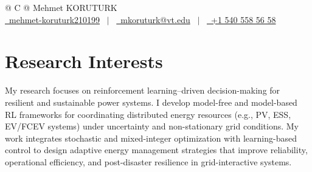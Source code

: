 \documentclass[a4paper,12pt]{article}
\begin{document}
\pagestyle{empty} 



\begin{tabularx}{\linewidth}{@{} C @{}}
\Huge{Mehmet KORUTURK} \\[7.5pt]
\href{https://www.linkedin.com/in/mehmet-koruturk210199/}{\ mehmet-koruturk210199} \ $|$ \ 
\href{mailto:mkoruturk@vt.edu}{\ mkoruturk@vt.edu} \ $|$ \ 
\href{tel:+15405585658}{\ +1 540 558 56 58} \\
\end{tabularx}


\section{Research Interests}

My research focuses on reinforcement learning–driven decision-making 
for resilient and sustainable power systems. I develop model-free and 
model-based RL frameworks for coordinating distributed energy resources 
(e.g., PV, ESS, EV/FCEV systems) under uncertainty and non-stationary grid conditions. 
My work integrates stochastic and mixed-integer optimization with learning-based control 
to design adaptive energy management strategies that improve reliability, 
operational efficiency, and post-disaster resilience in grid-interactive systems.

\end{document}
